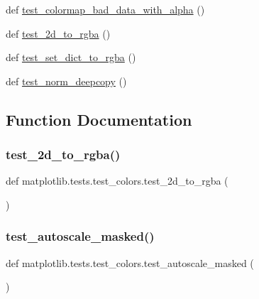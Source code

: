 \begin{DoxyCompactItemize}
def \hyperlink{namespacematplotlib_1_1tests_1_1test__colors_a21d609d99f008db7463e6e15647543c7}{test\+\_\+colormap\+\_\+bad\+\_\+data\+\_\+with\+\_\+alpha} ()
\item 
def \hyperlink{namespacematplotlib_1_1tests_1_1test__colors_aca071db7f7c467344839c7ad7f78ddb4}{test\+\_\+2d\+\_\+to\+\_\+rgba} ()
\item 
def \hyperlink{namespacematplotlib_1_1tests_1_1test__colors_adba83963ce3d3c9cca746e6c3a2456ac}{test\+\_\+set\+\_\+dict\+\_\+to\+\_\+rgba} ()
\item 
def \hyperlink{namespacematplotlib_1_1tests_1_1test__colors_a50dd4a0ed802ffeadba986c67fffc1d0}{test\+\_\+norm\+\_\+deepcopy} ()
\end{DoxyCompactItemize}


\subsection{Function Documentation}
\mbox{\label{namespacematplotlib_1_1tests_1_1test__colors_aca071db7f7c467344839c7ad7f78ddb4}} 
\subsubsection{\texorpdfstring{test\+\_\+2d\+\_\+to\+\_\+rgba()}{test\_2d\_to\_rgba()}}
{\footnotesize\ttfamily def matplotlib.\+tests.\+test\+\_\+colors.\+test\+\_\+2d\+\_\+to\+\_\+rgba (\begin{DoxyParamCaption}{ }\end{DoxyParamCaption})}

\mbox{\label{namespacematplotlib_1_1tests_1_1test__colors_a7167f8914fdc12ef256eb488ba02f43e}} 
\subsubsection{\texorpdfstring{test\+\_\+autoscale\+\_\+masked()}{test\_autoscale\_masked()}}
{\footnotesize\ttfamily def matplotlib.\+tests.\+test\+\_\+colors.\+test\+\_\+autoscale\+\_\+masked (\begin{DoxyParamCaption}{ }\end{DoxyParamCaption})}

